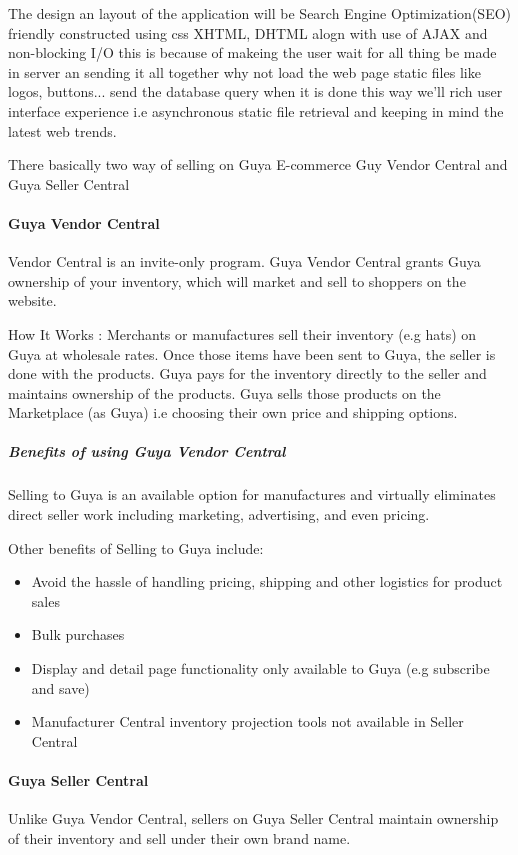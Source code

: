 
The design an layout of the application will be Search Engine Optimization(SEO) friendly constructed using css XHTML, DHTML alogn with use of AJAX and non-blocking I/O this is because of makeing the user wait for all thing be made in server an sending it  all together why not load the web page static files like logos, buttons... send the database query when it is done this way we'll rich user interface experience i.e asynchronous static file retrieval and keeping in mind the latest web trends.

There basically two way of selling on Guya E-commerce Guy Vendor Central and Guya Seller Central

\paragraph{Guya Vendor Central}
Vendor Central is an invite-only program. Guya Vendor Central grants Guya ownership of your inventory, which will market and sell to shoppers on the website.

How It Works : Merchants or manufactures sell their inventory (e.g hats) on Guya at wholesale rates. Once those items have been sent to Guya, the seller is done with the products. Guya pays for the inventory directly to the seller and maintains ownership of the products. Guya sells those products on the Marketplace (as Guya) i.e choosing their own price and shipping options.

\subparagraph{Benefits of using Guya Vendor Central}
Selling to Guya is an available option for manufactures and virtually eliminates direct seller work including marketing, advertising, and even pricing.

Other benefits of Selling to Guya include:

\begin{itemize}
	\item Avoid the hassle of handling pricing, shipping and other logistics for product sales
	\item Bulk purchases
	\item Display and detail page functionality only available to Guya (e.g subscribe and save)
	\item Manufacturer Central inventory projection tools not available in Seller Central
\end{itemize}

\paragraph{Guya Seller Central}
Unlike Guya Vendor Central, sellers on Guya Seller Central maintain ownership of their inventory and sell under their own brand name.

